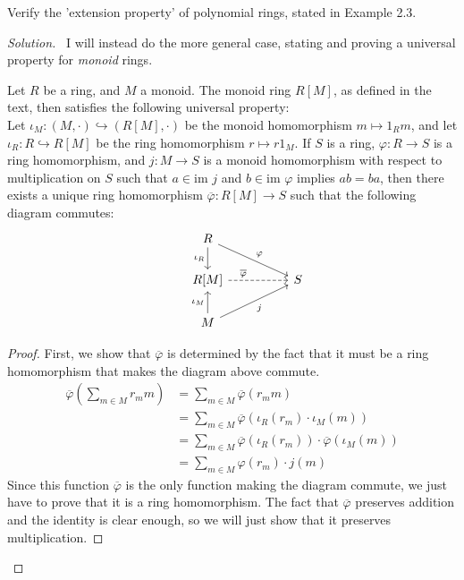 \documentclass[12pt]{article}
\newenvironment{problem}[2][Problem]{\begin{trivlist}
\item[\hskip \labelsep {\bfseries #1}\hskip \labelsep {\bfseries #2.}]}{\end{trivlist}}
\newenvironment{proposition}[1][Proposition]{\begin{trivlist}
\item[\hskip \labelsep {\bfseries #1.}]}{\end{trivlist}}
\newcommand{\im}{\text{im }}
\newenvironment{solution}
  {\renewcommand\qedsymbol{$\blacksquare$}\begin{proof}[Solution]}
{\end{proof}}
\newenvironment{sproof}{
  \renewcommand\qedsymbol{$\square$}
  \begin{proof}
  }{
  \end{proof}
}
\theoremstyle{remark}
\begin{document}
\begin{problem}{2.6}
Verify the 'extension property' of polynomial rings, stated in Example 2.3.
\end{problem}
\begin{solution}\ 
  I will instead do the more general case, stating and proving a universal property for \textit{monoid} rings.
  \begin{proposition}
    Let $R$ be a ring, and $M$ a monoid.
    The monoid ring $R[M]$, as defined in the text, then satisfies the following universal property:\\
    \indent Let $\iota_M : (M,\cdot)\hookrightarrow (R[M],\cdot)$ be the monoid homomorphism
    $m\mapsto 1_Rm$, and let $\iota_R:R\hookrightarrow R[M]$ be the ring homomorphism
    $r\mapsto r1_M$.
    If $S$ is a ring, $\varphi:R\to S$ is a ring homomorphism, and $j:M\to S$ is a monoid homomorphism
    with respect to multiplication on $S$ such that $a\in\im j$ and $b\in\im\varphi$ implies $ab=ba$,
    then there exists a unique ring homomorphism $\overline\varphi:R[M]\to S$ such that the following
    diagram commutes:
    \[
      \begin{tikzcd}
        & R \ar{d}[swap]{\iota_R} \ar{drr}{\varphi} \\
        & R[M] \ar[dashed,near start]{rr}{\overline\varphi} && S \\
        & M \ar{u}{\iota_M} \ar{urr}[swap]{j}
      \end{tikzcd}
    \]
  \end{proposition}
  \begin{sproof}
  First, we show that $\overline\varphi$ is determined by the fact that it must be a ring homomorphism
  that makes the diagram above commute.
  \begin{align*}
    \overline\varphi\left( \sum_{m\in M} r_mm \right) &=\sum_{m\in M}\overline\varphi(r_mm) \\
    &= \sum_{m\in M} \overline\varphi(\iota_R(r_m)\cdot\iota_M(m)) \\
    &= \sum_{m\in M} \overline\varphi(\iota_R(r_m))\cdot\overline\varphi(\iota_M(m)) \\
    &= \sum_{m\in M} \varphi(r_m)\cdot j(m)
  \end{align*}
  \indent Since this function $\overline\varphi$ is the only function making the diagram commute, 
  we just have to prove that it is a ring homomorphism.
  The fact that $\overline\varphi$ preserves addition and the identity is clear enough, so we will
  just show that it preserves multiplication.

\end{sproof}
\end{solution}
\end{document}

